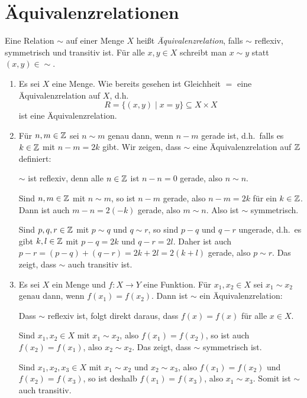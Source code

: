 \section{Äquivalenzrelationen}
\begin{defi}
 Eine Relation $\sim$ auf einer Menge $X$ heißt \emph{Äquivalenzrelation}, falls $\sim$ reflexiv, symmetrisch und transitiv ist. Für alle $x,y \in X$ schreibt man $x \sim y$ statt $(x,y) \in \sim$.
\end{defi}

\begin{bsp}
 \begin{enumerate}[leftmargin=*]
 
  \item
   Es sei $X$ eine Menge. Wie bereits gesehen ist Gleichheit $=$ eine Äquivalenzrelation auf $X$, d.h.\
   \[
    R = \{(x,y) \mid x = y\} \subseteq X \times X
   \]
   ist eine Äquivalenzrelation.
   
  \item
   Für $n,m \in \mathbb{Z}$ sei $n \sim m$ genau dann, wenn $n-m$ gerade ist, d.h.\ falls es $k \in \mathbb{Z}$ mit $n-m = 2k$ gibt. Wir zeigen, dass $\sim$ eine Äquivalenzrelation auf $\mathbb{Z}$ definiert:
   
   $\sim$ ist reflexiv, denn alle $n \in \mathbb{Z}$ ist $n-n = 0$ gerade, also $n \sim n$.
   
   Sind $n,m \in \mathbb{Z}$ mit $n \sim m$, so ist $n-m$ gerade, also $n-m = 2k$ für ein $k \in \mathbb{Z}$. Dann ist auch $m-n = 2(-k)$ gerade, also $m \sim n$. Also ist $\sim$ symmetrisch.
   
   Sind $p,q,r \in \mathbb{Z}$ mit $p \sim q$ und $q \sim r$, so sind $p-q$ und $q-r$ ungerade, d.h.\ es gibt $k,l \in \mathbb{Z}$ mit $p-q = 2k$ und $q-r = 2l$. Daher ist auch $p-r = (p-q)+(q-r) = 2k + 2l = 2(k+l)$ gerade, also $p \sim r$. Das zeigt, dass $\sim$ auch transitiv ist.
   
  \item
   Es sei $X$ ein Menge und $f \colon X \to Y$ eine Funktion. Für $x_1, x_2 \in X$ sei $x_1 \sim x_2$ genau dann, wenn $f(x_1) = f(x_2)$. Dann ist $\sim$ ein Äquivalenzrelation:
   
   Dass $\sim$ reflexiv ist, folgt direkt daraus, dass $f(x) = f(x)$ für alle $x \in X$.
   
   Sind $x_1, x_2 \in X$ mit $x_1 \sim x_2$, also $f(x_1) = f(x_2)$, so ist auch $f(x_2) = f(x_1)$, also $x_2 \sim x_2$. Das zeigt, dass $\sim$ symmetrisch ist.
   
   Sind $x_1, x_2, x_3 \in X$ mit $x_1 \sim x_2$ und $x_2 \sim x_3$, also $f(x_1) = f(x_2)$ und $f(x_2) = f(x_3)$, so ist deshalb $f(x_1) = f(x_3)$, also $x_1 \sim x_3$. Somit ist $\sim$ auch transitiv.
   

\end{enumerate}
\end{bsp}
